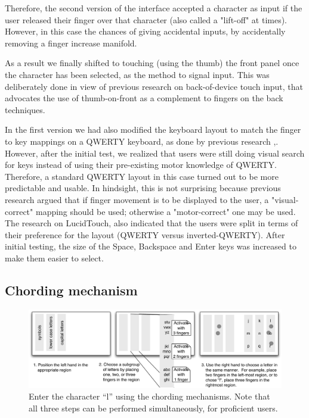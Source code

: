 Therefore, the second version of the interface accepted a character as input if the user released their finger over that character (also called a "lift-off" at times). However, in this case the chances of giving accidental inputs, by accidentally removing a finger increase manifold. 

As a result we finally shifted to touching (using the thumb) the front panel once the character has been selected, as the method to signal input. This was deliberately done in view of previous research on back-of-device touch input, that advocates the use of thumb-on-front as a complement to fingers on the back techniques. \cite{Wobbrock} 

In the first version we had also modified the keyboard layout to match the finger to key mappings on a QWERTY keyboard, as done by previous research \cite{RearType},\cite{LucidTouch}. However, after the initial test, we realized that users were still doing visual search for keys instead of using their pre-existing motor knowledge of QWERTY. Therefore, a standard QWERTY layout in this case turned out to be more predictable and usable. In hindsight, this is not surprising because previous research \cite{Wobbrock} argued that if finger movement is to be displayed to the user, a "visual-correct" mapping should be used; otherwise a "motor-correct" one may be used. The research on LucidTouch, also indicated that the users were split in terms of their preference for the layout (QWERTY versus inverted-QWERTY). After initial testing, the size of the Space, Backspace and Enter keys was increased to make them easier to select.

\subsection{Chording mechanism}
\begin{figure}
    \includegraphics[width=\textwidth]{Figures/chording_explaination.pdf} 
    \caption{Enter the character ``l'' using the chording mechanisms.
      Note that all three steps can be performed simultaneously, for
      proficient users.}
    \label{fig:chording_explanation}
\end{figure} 

